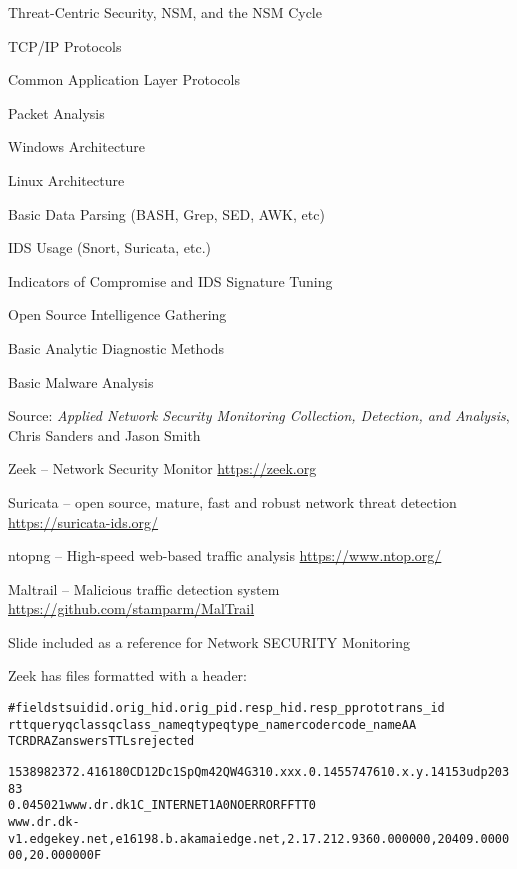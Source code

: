 \documentclass[Screen16to9,17pt]{foils}
\begin{document}
\begin{list2}\small
\item Threat-Centric Security, NSM, and the NSM Cycle
\item TCP/IP Protocols
\item Common Application Layer Protocols
\item Packet Analysis
\item Windows Architecture
\item Linux Architecture
\item Basic Data Parsing (BASH, Grep, SED, AWK, etc)
\item IDS Usage (Snort, Suricata, etc.)
\item Indicators of Compromise and IDS Signature Tuning
\item Open Source Intelligence Gathering
\item Basic Analytic Diagnostic Methods
\item Basic Malware Analysis
\end{list2}

Source: \emph{Applied Network Security Monitoring Collection, Detection, and Analysis}, Chris Sanders and Jason Smith





\begin{list1}
\item Zeek -- Network Security Monitor {\footnotesize\url{https://zeek.org}}
\item Suricata -- open source, mature, fast and robust network threat detection {\footnotesize\url{https://suricata-ids.org/}}
\item ntopng -- High-speed web-based traffic analysis  {\footnotesize\url{https://www.ntop.org/}}
\item Maltrail -- Malicious traffic detection system {\footnotesize\url{https://github.com/stamparm/MalTrail}}
\end{list1}

Slide included as a reference for Network SECURITY Monitoring



Zeek has files formatted with a header:
\begin{alltt}\footnotesize
#fields ts      uid     id.orig_h       id.orig_p       id.resp_h       id.resp_p       proto   trans_id
        rtt     query   qclass  qclass_name     qtype   qtype_name      rcode   rcode_name      AA
        TC      RD      RA      Z       answers TTLs    rejected

1538982372.416180	CD12Dc1SpQm42QW4G3	10.xxx.0.145	57476	10.x.y.141	53	udp	20383
	0.045021	www.dr.dk	1	C_INTERNET	1	A	0	NOERROR	F	F	T	T	0
   www.dr.dk-v1.edgekey.net,e16198.b.akamaiedge.net,2.17.212.93	60.000000,20409.000000,20.000000	F
\end{alltt}
\end{document}
